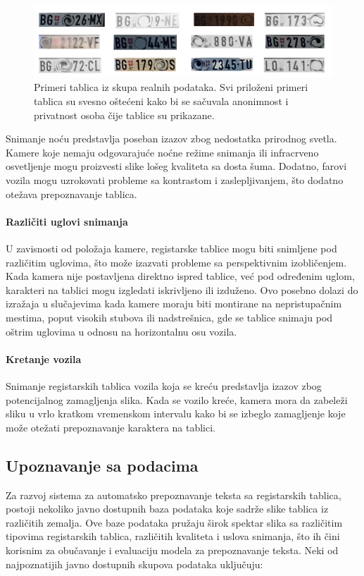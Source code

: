 \documentclass[a4paper,12pt]{article}
\begin{document}
	\begin{figure}[H]
		\centering
		\includegraphics[width=\textwidth]{assets/license-plate-samples.png}
		\caption{Primeri tablica iz skupa realnih podataka. Svi priloženi primeri tablica su svesno oštećeni kako bi se sačuvala anonimnost i privatnost osoba čije tablice su prikazane.}
		\label{fig:license-plate-samples}
	\end{figure}
	
	Snimanje noću predstavlja poseban izazov zbog nedostatka prirodnog svetla. Kamere koje nemaju odgovarajuće noćne režime snimanja ili infracrveno osvetljenje mogu proizvesti slike lošeg kvaliteta sa dosta šuma. Dodatno, farovi vozila mogu uzrokovati probleme sa kontrastom i zaslepljivanjem, što dodatno otežava prepoznavanje tablica.
	
	\paragraph{Različiti uglovi snimanja}
	U zavisnosti od položaja kamere, registarske tablice mogu biti snimljene pod različitim uglovima, što može izazvati probleme sa perspektivnim izobličenjem. Kada kamera nije postavljena direktno ispred tablice, već pod određenim uglom, karakteri na tablici mogu izgledati iskrivljeno ili izduženo. Ovo posebno dolazi do izražaja u slučajevima kada kamere moraju biti montirane na nepristupačnim mestima, poput visokih stubova ili nadstrešnica, gde se tablice snimaju pod oštrim uglovima u odnosu na horizontalnu osu vozila.
	
	\paragraph{Kretanje vozila}
	Snimanje registarskih tablica vozila koja se kreću predstavlja izazov zbog potencijalnog zamagljenja slika. Kada se vozilo kreće, kamera mora da zabeleži sliku u vrlo kratkom vremenskom intervalu kako bi se izbeglo zamagljenje koje može otežati prepoznavanje karaktera na tablici.
	
	\subsection{Upoznavanje sa podacima}
	Za razvoj sistema za automatsko prepoznavanje teksta sa registarskih tablica, postoji nekoliko javno dostupnih baza podataka koje sadrže slike tablica iz različitih zemalja. Ove baze podataka pružaju širok spektar slika sa različitim tipovima registarskih tablica, različitih kvaliteta i uslova snimanja, što ih čini korisnim za obučavanje i evaluaciju modela za prepoznavanje teksta. Neki od najpoznatijih javno dostupnih skupova podataka uključuju:
	
\end{document}

